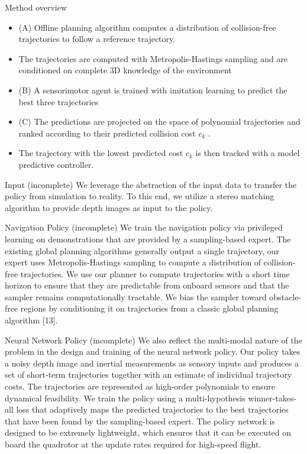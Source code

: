 \documentclass{beamer}
\begin{document}
\begin{frame}{Method overview}
	\begin{itemize}
		\item (A) Offline planning algorithm computes a distribution of collision-free trajectories to follow a reference trajectory. 
		\item The trajectories are computed with Metropolis-Hastings sampling and are conditioned on complete 3D knowledge of the environment
		\item (B) A sensorimotor agent is trained with imitation learning to predict the best three trajectories
		\item (C) The predictions are projected on the
space of polynomial trajectories and ranked according to their predicted collision cost $c_k$ . 
		\item The trajectory with the lowest predicted cost $c_k$ is then
tracked with a model predictive controller.
	\end{itemize}
\end{frame}

\begin{frame}{Input (incomplete)}
	We leverage the abstraction of the input data to transfer the policy from simulation to reality. To this end, we utilize a stereo matching algorithm \autocite{stereoMatching} to provide depth images as input to the policy. 
\end{frame}


\begin{frame}{Navigation Policy (incomplete)}
	We train the navigation policy via privileged learning \autocite{Privileged_Learning} on demonstrations that are provided by a sampling-based expert. The existing global planning algorithms \autocite{global_planning} generally output a single trajectory, our expert uses Metropolis-Hastings \autocite{MH_hasting} sampling to compute a distribution of collision-free trajectories. We use our planner to compute trajectories with a short time horizon to ensure that they are predictable from onboard sensors and that the sampler remains computationally tractable. We bias the sampler toward obstacle-free regions by conditioning it on trajectories from a classic global planning algorithm [13].
	
\end{frame}

\begin{frame}{Neural Network Policy (incomplete)}
	We also reflect the multi-modal nature of the problem in the design and training of the neural network policy. Our policy takes a noisy depth image and inertial measurements as sensory inputs and produces a set of short-term trajectories together with an estimate of individual trajectory costs. The trajectories are represented as high-order polynomials to ensure dynamical feasibility. We train the policy using a multi-hypothesis winner-takes-all loss that adaptively maps the predicted trajectories to the best trajectories that have been found by the sampling-based expert. The policy network is designed to be extremely lightweight, which ensures that it can be executed on board the quadrotor at the update rates required for high-speed flight.
	
\end{frame}
\end{document}
